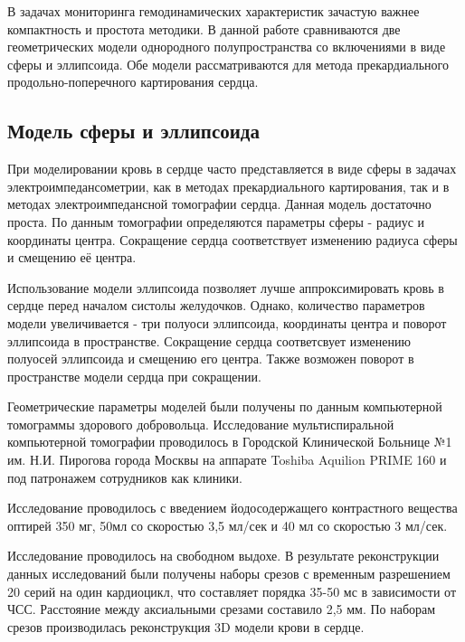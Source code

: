 \documentclass[conference]{IEEEtran}
\begin{document}
В задачах мониторинга гемодинамических характеристик зачастую важнее компактность и простота методики.
В данной работе сравниваются две геометрических модели однородного полупространства со включениями в виде сферы и эллипсоида.
Обе модели рассматриваются для метода прекардиального продольно-поперечного картирования сердца.

\subsection{Модель сферы и эллипсоида}


При моделировании кровь в сердце часто представляется в виде сферы в задачах электроимпедансометрии, как в методах прекардиального картирования,
так и в методах электроимпедансной томографии сердца.
Данная модель достаточно проста.
По данным томографии определяются параметры сферы - радиус и координаты центра.
Сокращение сердца соответствует изменению радиуса сферы и смещению её центра.

Использование модели эллипсоида позволяет лучше аппроксимировать кровь в сердце перед началом систолы желудочков.
Однако, количество параметров модели увеличивается - три полуоси эллипсоида, координаты центра и поворот эллипсоида в пространстве.
Сокращение сердца соответсвует изменению полуосей эллипсоида и смещению его центра.
Также возможен поворот в пространстве модели сердца при сокращении.

Геометрические параметры моделей были получены по данным компьютерной томограммы здорового добровольца.
Исследование мультиспиральной компьютерной томографии проводилось в Городской Клинической Больнице №1 им. Н.И. Пирогова города Москвы на аппарате Toshiba
Aquilion PRIME 160 и под патронажем сотрудников как клиники.

Исследование проводилось с введением йодосодержащего контрастного вещества оптирей 350 мг,
50мл со скоростью 3,5 мл/сек и 40 мл со скоростью 3 мл/сек.

Исследование проводилось на свободном выдохе.
В результате реконструкции данных исследований были получены наборы срезов
с временным разрешением 20 серий на один кардиоцикл, что составляет порядка 35-50 мс
в зависимости от ЧСС.
Расстояние между аксиальными срезами составило 2,5 мм.
По наборам срезов производилась реконструкция 3D модели крови в сердце.
\end{document}
